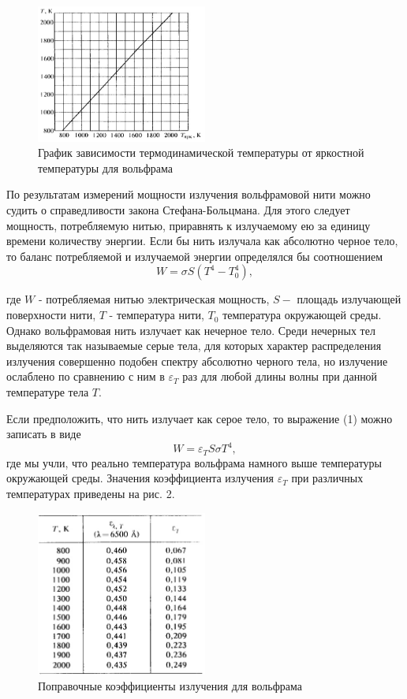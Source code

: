 \documentclass[a4paper, 12pt]{article}
\begin{document}
\begin{figure}[H]
    \centering
    \includegraphics[width=0.5\textwidth]{tunsgten.jpg}
    \caption{График зависимости термодинамической температуры от яркостной температуры для вольфрама}
    \label{fig:tungs}
\end{figure}


По результатам измерений мощности излучения вольфрамовой нити можно судить о справедливости закона Стефана-Больцмана. Для этого следует мощность, потребляемую нитью, приравнять к излучаемому ею за единицу времени количеству энергии. Если бы нить излучала как абсолютно черное тело, то баланс потребляемой и излучаемой энергии определялся бы соотношением
\begin{equation}
W=\sigma S\left(T^4-T_0^4\right),
\end{equation}

где $W$ - потребляемая нитью электрическая мощность, $S-$ площадь излучающей поверхности нити, $T$ - температура нити, $T_0$ температура окружающей среды. Однако вольфрамовая нить излучает как нечерное тело. Среди нечерных тел выделяются так называемые серые тела, для которых характер распределения излучения совершенно подобен спектру абсолютно черного тела, но излучение ослаблено по сравнению с ним в $\varepsilon_T$ раз для любой длины волны при данной температуре тела $T$.

Если предположить, что нить излучает как серое тело, то выражение (1) можно записать в виде
\begin{equation}
W=\varepsilon_T S \sigma T^4,
\end{equation}
где мы учли, что реально температура вольфрама намного выше температуры окружающей среды. Значения коэффициента излучения $\varepsilon_T$ при различных температурах приведены на рис. 2.

\begin{figure}[H]
    \centering
    \includegraphics[width=0.5\textwidth]{tabl1.jpg}
    \caption{Поправочные коэффициенты излучения для вольфрама}
    \label{fig:tabl}
\end{figure}
\end{document}
